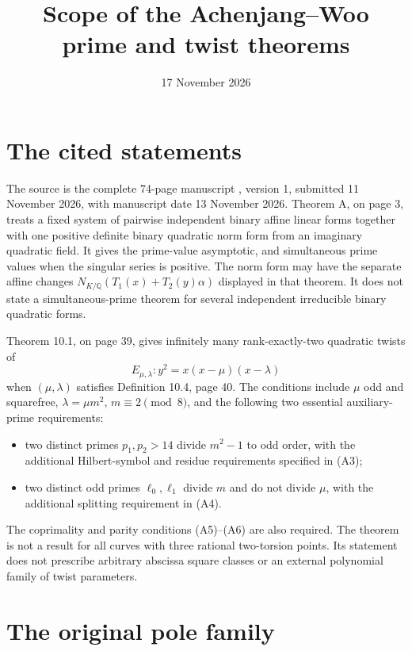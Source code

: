\documentclass[11pt,a4paper]{article}
\title{Scope of the Achenjang--Woo prime and twist theorems}
\author{}\date{17 November 2026}
\newcommand{\Q}{\mathbb Q}
\begin{document}
\maketitle

\section{The cited statements}

The source is the complete 74-page manuscript \cite{AW}, version 1,
submitted 11 November 2026, with manuscript date 13 November 2026.
Theorem A, on page 3, treats a fixed system of pairwise independent
binary affine linear forms together with one positive definite binary
quadratic norm form from an imaginary quadratic field. It gives the
prime-value asymptotic, and simultaneous prime values when the singular
series is positive. The norm form may have the separate affine changes
$N_{K/\Q}(T_1(x)+T_2(y)\alpha)$ displayed in that theorem.
It does not state a simultaneous-prime theorem for several independent
irreducible binary quadratic forms.

Theorem 10.1, on page 39, gives infinitely many rank-exactly-two
quadratic twists of
\[
 E_{\mu,\lambda}:y^2=x(x-\mu)(x-\lambda)
\]
when $(\mu,\lambda)$ satisfies Definition 10.4, page 40. The
conditions include $\mu$ odd and squarefree, $\lambda=\mu m^2$,
$m\equiv2\pmod8$, and the following two essential auxiliary-prime
requirements:
\begin{itemize}
\item two distinct primes $p_1,p_2>14$ divide $m^2-1$ to odd order,
      with the additional Hilbert-symbol and residue requirements
      specified in (A3);
\item two distinct odd primes $\ell_0,\ell_1$ divide $m$ and do not
      divide $\mu$, with the additional splitting requirement in (A4).
\end{itemize}
The coprimality and parity conditions (A5)--(A6) are also required.
The theorem is not a result for all curves with three rational
two-torsion points. Its statement does not prescribe arbitrary
abscissa square classes or an external polynomial family of twist
parameters.

\section{The original pole family}
\end{document}
